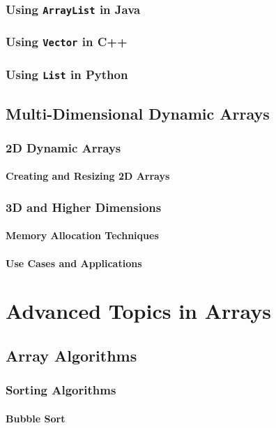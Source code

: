\documentclass[12pt, oneside]{book}
\begin{document}
	\subsection{Using \texttt{ArrayList} in Java}
	\subsection{Using \texttt{Vector} in C++}
	\subsection{Using \texttt{List} in Python}
	
	\section{Multi-Dimensional Dynamic Arrays}
	\subsection{2D Dynamic Arrays}
	\subsubsection{Creating and Resizing 2D Arrays}
	\subsection{3D and Higher Dimensions}
	\subsubsection{Memory Allocation Techniques}
	\subsubsection{Use Cases and Applications}
	
\chapter{Advanced Topics in Arrays}
	\section{Array Algorithms}
	\subsection{Sorting Algorithms}
	\subsubsection{Bubble Sort}
\end{document}
